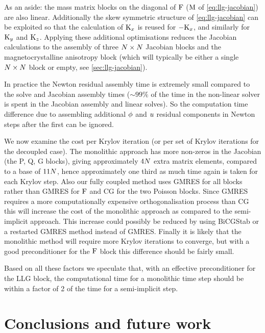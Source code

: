 As an aside: the mass matrix blocks on the diagonal of $\mathrm{F}$ ($\mathrm{M}$ of \cref{eq:llg-jacobian}) are also linear.
Additionally the skew symmetric structure of \cref{eq:llg-jacobian} can be exploited so that the calculation of $\mathrm{K}_x$ is reused for $-\mathrm{K}_x$, and similarly for $\mathrm{K}_y$ and $\mathrm{K}_z$.
Applying these additional optimisations reduces the Jacobian calculations to the assembly of three $N \times N$ Jacobian blocks and the magnetocrystalline anisotropy block (which will typically be either a single $N \times N$ block or empty, see \cref{sec:llg-jacobian}).

In practice the Newton residual assembly time is extremely small compared to the solve and Jacobian assembly times ($\sim 99 \%$ of the time in the non-linear solver is spent in the Jacobian assembly and linear solves).
So the computation time difference due to assembling additional $\phi$ and $u$ residual components in Newton steps after the first can be ignored.

We now examine the cost per Krylov iteration (or per set of Krylov iterations for the decoupled case).
The monolithic approach has more non-zeros in the Jacobian (the P, Q, G blocks), giving approximately $4 N$ extra matrix elements, compared to a base of $11 N$, hence approximately one third as much time again is taken for each Krylov step.
Also our fully coupled method uses GMRES for all blocks rather than GMRES for $\mathrm{F}$ and CG for the two Poisson blocks.
Since GMRES requires a more computationally expensive orthogonalisation process than CG this will increase the cost of the monolithic approach as compared to the semi-implicit approach.
This increase could possibly be reduced by using BiCGStab or a restarted GMRES method instead of GMRES.
Finally it is likely that the monolithic method will require more Krylov iterations to converge, but with a good preconditioner for the $\mathrm{F}$ block this difference should be fairly small.

Based on all these factors we speculate that, with an effective preconditioner for the LLG block, the computational time for a monolithic time step should be within a factor of 2 of the time for a semi-implicit step.


\section{Conclusions and future work}

